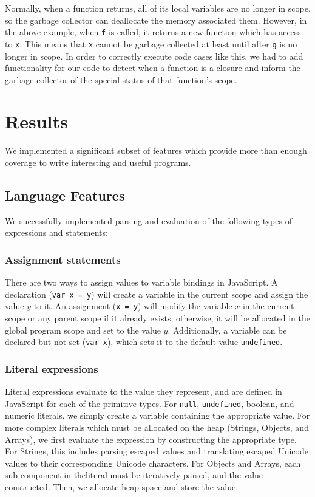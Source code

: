 \documentclass{article}
\begin{document}
\begin{multicols}{2}
\vspace{3mm}

Normally, when a function returns, all of its local variables are no longer in
scope, so the garbage collector can deallocate the memory associated them.
However, in the above example, when \texttt{f} is called, it returns a new
function which has access to \texttt{x}. This means that \texttt{x} cannot
be garbage collected at least until after \texttt{g} is no longer in scope.
In order to correctly execute code cases like this, we had to add functionality
for our code to detect when a function is a closure and inform the garbage
collector of the special status of that function's scope.

\section{Results}

We implemented a significant subset of features which provide more than enough
coverage to write interesting and useful programs.

\subsection{Language Features}

We successfully implemented parsing and evaluation of the following types of
expressions and statements:

\subsubsection*{Assignment statements}

There are two ways to assign values to variable bindings in JavaScript. A
declaration (\texttt{var x = y}) will create a variable in the current scope and
assign the value $y$ to it. An assignment (\texttt{x = y}) will modify the
variable $x$ in the current scope or any parent scope if it already exists;
otherwise, it will be allocated in the global program scope and set to the value
$y$. Additionally, a variable can be declared but not set (\texttt{var x}),
which sets it to the default value \texttt{undefined}.

\subsubsection*{Literal expressions}

Literal expressions evaluate to the value they represent, and are defined in
JavaScript for each of the primitive types. For \texttt{null},
\texttt{undefined}, boolean, and numeric literals, we simply create a variable
containing the appropriate value. For more complex literals which must be
allocated on the heap (Strings, Objects, and Arrays), we first evaluate the
expression by constructing the appropriate type. For Strings, this includes
parsing escaped values and translating escaped Unicode values to their
corresponding Unicode characters. For Objects and Arrays, each sub-component in
theliteral must be iteratively parsed, and the value constructed. Then, we
allocate heap space and store the value.


\end{multicols}
\end{document}

